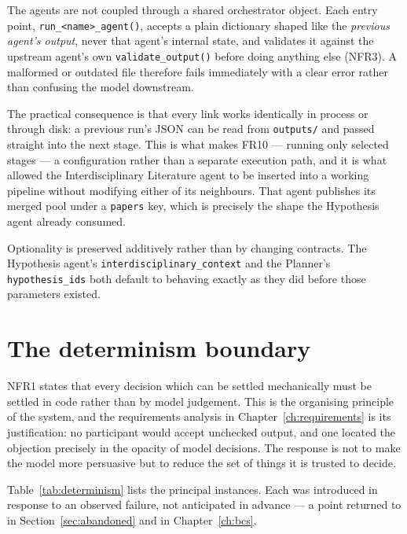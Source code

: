 The agents are not coupled through a shared orchestrator object. Each entry point,
\texttt{run\_<name>\_agent()}, accepts a plain dictionary shaped like the \emph{previous
agent's output}, never that agent's internal state, and validates it against the upstream
agent's own \texttt{validate\_output()} before doing anything else (NFR3). A malformed or
outdated file therefore fails immediately with a clear error rather than confusing the model
downstream.

The practical consequence is that every link works identically in process or through disk: a
previous run's JSON can be read from \texttt{outputs/} and passed straight into the next
stage. This is what makes FR10 --- running only selected stages --- a configuration rather
than a separate execution path, and it is what allowed the Interdisciplinary Literature agent
to be inserted into a working pipeline without modifying either of its neighbours. That agent
publishes its merged pool under a \texttt{papers} key, which is precisely the shape the
Hypothesis agent already consumed.

Optionality is preserved additively rather than by changing contracts. The Hypothesis agent's
\texttt{interdisciplinary\_context} and the Planner's \texttt{hypothesis\_ids} both default to
behaving exactly as they did before those parameters existed.

\section{The determinism boundary}
\label{sec:determinism}

NFR1 states that every decision which can be settled mechanically must be settled in code
rather than by model judgement. This is the organising principle of the system, and the
requirements analysis in Chapter~\ref{ch:requirements} is its justification: no participant
would accept unchecked output, and one located the objection precisely in the opacity of model
decisions. The response is not to make the model more persuasive but to reduce the set of
things it is trusted to decide.

Table~\ref{tab:determinism} lists the principal instances. Each was introduced in response to
an observed failure, not anticipated in advance --- a point returned to in
Section~\ref{sec:abandoned} and in Chapter~\ref{ch:bcs}.

